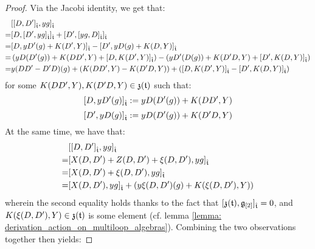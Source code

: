 \begin{proof}
                Via the Jacobi identity, we get that:
                    $$
                        \begin{aligned}
                            & [ [D, D']_{\hat{\mathfrak{t}}}, y g ]_{\hat{\mathfrak{t}}}
                            \\
                            = & [ D, [ D', y g ]_{\hat{\mathfrak{t}}} ]_{\hat{\mathfrak{t}}} + [ D', [ y g, D ]_{\hat{\mathfrak{t}}} ]_{\hat{\mathfrak{t}}}
                            \\
                            = & [ D, y D'( g ) + K(D', Y) ]_{\hat{\mathfrak{t}}} - [ D', y D( g ) + K(D, Y) ]_{\hat{\mathfrak{t}}}
                            \\
                            = & \left( y D( D'(g) ) + K(DD', Y) + [ D, K(D', Y) ]_{\hat{\mathfrak{t}}} \right) - \left( y D'( D(g) ) + K(D'D, Y) + [ D', K(D, Y) ]_{\hat{\mathfrak{t}}} \right)
                            \\
                            = & y (DD' - D'D)( g ) + ( K(DD', Y) - K(D'D, Y) ) + ( [ D, K(D', Y) ]_{\hat{\mathfrak{t}}} - [ D', K(D, Y) ]_{\hat{\mathfrak{t}}} )
                        \end{aligned}
                    $$
                for some $K(DD', Y), K(D'D, Y) \in \mathfrak{z}(\mathfrak{t})$ such that:
                    $$[ D, y D'( g ) ]_{\hat{\mathfrak{t}}} := y D( D'( g ) ) + K(DD', Y)$$
                    $$[ D', y D( g ) ]_{\hat{\mathfrak{t}}} := y D( D'( g ) ) + K(D'D, Y)$$
                At the same time, we have that:
                    $$
                        \begin{aligned}
                            & [ [D, D']_{\hat{\mathfrak{t}}}, y g ]_{\hat{\mathfrak{t}}}
                            \\
                            = & [ X(D, D') + Z(D, D') + \xi(D, D') , y g ]_{\hat{\mathfrak{t}}}
                            \\
                            = & [ X(D, D') + \xi(D, D') , y g ]_{\hat{\mathfrak{t}}}
                            \\
                            = & [ X(D, D') , y g ]_{\hat{\mathfrak{t}}} + \left( y \xi(D, D')(g) + K(\xi(D, D'), Y) \right)
                        \end{aligned}
                    $$
                wherein the second equality holds thanks to the fact that $[\mathfrak{z}(\mathfrak{t}), \mathfrak{g}_{[2]}]_{\hat{\mathfrak{t}}} = 0$, and $K(\xi(D, D'), Y) \in \mathfrak{z}(\mathfrak{t})$ is some element (cf. lemma \ref{lemma: derivation_action_on_multiloop_algebras}). Combining the two observations together then yields:

\end{proof}
